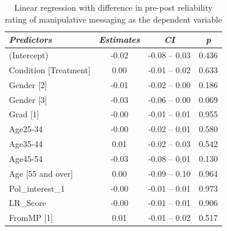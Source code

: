 \documentclass[empirical, authordate]{jote-new-article}
\begin{document}
\begin{table}

  \caption{Linear regression with difference in pre-post reliability rating of manipulative messaging as the dependent variable }
  \label{tab:tableS33}


  \begin{tabularx}{\linewidth}{@{} X  S  S  S@{}}

    \toprule
    \emph{Predictors}                                    & {\emph{Estimates}}                        & {\emph{\emph{CI}}} & {\emph{p}} \\
    \midrule
    (Intercept)                                          & -0.02                                     & -0.08 -- 0.03      & 0.436      \\
    Condition [Treatment]                                & 0.00                                      & -0.01 -- 0.02      & 0.633      \\
    Gender [2]                                           & -0.01                                     & -0.02 -- 0.00      & 0.186      \\
    Gender [3]                                           & -0.03                                     & -0.06 -- 0.00      & 0.069      \\
    Grad [1]                                             & -0.00                                     & -0.01 -- 0.01      & 0.955      \\
    Age25-34                                             & -0.00                                     & -0.02 -- 0.01      & 0.580      \\
    Age35-44                                             & 0.01                                      & -0.02 -- 0.03      & 0.542      \\
    Age45-54                                             & -0.03                                     & -0.08 -- 0.01      & 0.130      \\
    Age [55 and over]                                    & 0.00                                      & -0.09 -- 0.10      & 0.964      \\
    Pol\_interest\_1                                     & -0.00                                     & -0.01 -- 0.01      & 0.973      \\
    LR\_Score                                            & -0.00                                     & -0.01 -- 0.01      & 0.906      \\
    FromMP [1]                                           & 0.01                                      & -0.01 -- 0.02      & 0.517      \\

\end{tabularx}
\end{table}
\end{document}

